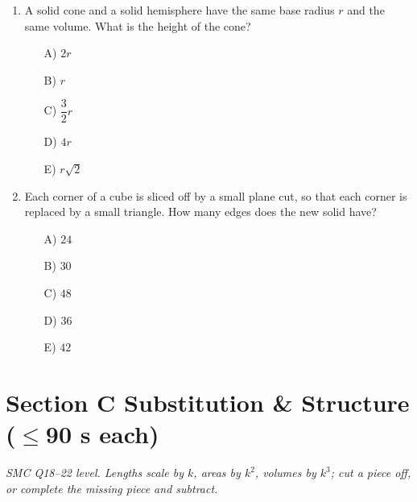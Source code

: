 \documentclass[11pt,a4paper]{article}
\begin{document}
\begin{enumerate}
\item A solid cone and a solid hemisphere have the same base radius $r$ and the same volume. What is the height of the cone?
\begin{itemize}[itemsep=3pt]
\item[A)] $2r$
\item[B)] $r$
\item[C)] $\dfrac32r$
\item[D)] $4r$
\item[E)] $r\sqrt2$
\end{itemize}

\item Each corner of a cube is sliced off by a small plane cut, so that each corner is replaced by a small triangle. How many edges does the new solid have?
\begin{itemize}
\item[A)] $24$
\item[B)] $30$
\item[C)] $48$
\item[D)] $36$
\item[E)] $42$
\end{itemize}

\end{enumerate}

\section*{Section C \quad Substitution \& Structure \hfill{\normalfont\small($\leq$90 s each)}}

\noindent\textit{SMC Q18--22 level. Lengths scale by $k$, areas by $k^2$, volumes by $k^3$; cut a piece off, or complete the missing piece and subtract.}
\end{document}
